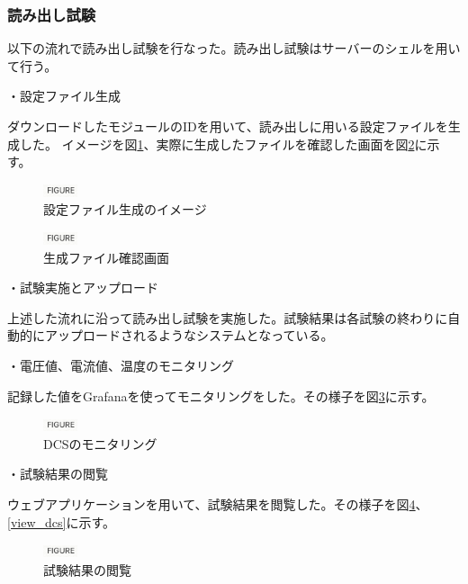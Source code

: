 \subsubsection{読み出し試験}
以下の流れで読み出し試験を行なった。読み出し試験はサーバーのシェルを用いて行う。

・設定ファイル生成

ダウンロードしたモジュールのIDを用いて、読み出しに用いる設定ファイルを生成した。
イメージを図\ref{config_retriever}、実際に生成したファイルを確認した画面を図\ref{create_config}に示す。

\begin{figure}[bpt]\centering
\includegraphics[width=1cm]{figure}
\caption[設定ファイル生成のイメージ]{設定ファイル生成のイメージ}
\label{config_retriever}
\end{figure}

\begin{figure}[bpt]\centering
\includegraphics[width=1cm]{figure}
\caption[生成ファイル確認画面]{生成ファイル確認画面}
\label{create_config}
\end{figure}

・試験実施とアップロード

上述した流れに沿って読み出し試験を実施した。試験結果は各試験の終わりに自動的にアップロードされるようなシステムとなっている。

・電圧値、電流値、温度のモニタリング

記録した値をGrafanaを使ってモニタリングをした。その様子を図\ref{monitoring_dcs}に示す。

\begin{figure}[bpt]\centering
\includegraphics[width=1cm]{figure}
\caption[DCSのモニタリング]{DCSのモニタリング}
\label{monitoring_dcs}
\end{figure}

・試験結果の閲覧

ウェブアプリケーションを用いて、試験結果を閲覧した。その様子を図\ref{view_scan_result}、\ref{view_dcs}に示す。

\begin{figure}[bpt]\centering
\includegraphics[width=1cm]{figure}
\caption[試験結果の閲覧]{試験結果の閲覧}
\label{view_scan_result}
\end{figure}

